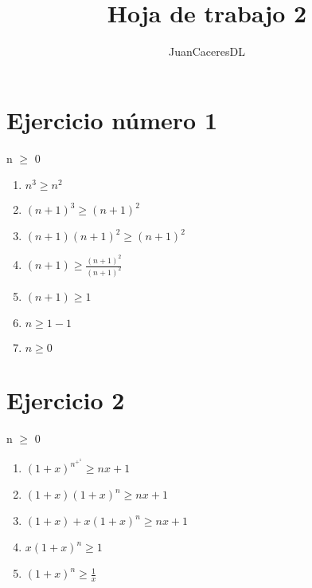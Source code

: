 \documentclass{article}
\title{Hoja de trabajo 2}
\author{JuanCaceresDL}
\begin{document}
\maketitle

\section{Ejercicio número 1}
\centering n $\geq$ 0
\begin{enumerate}
    \item $n^3 \geq n^2$
    \item $(n + 1)^3 \geq (n + 1)^2$
    \item $(n + 1)(n + 1)^2 \geq (n + 1)^2$
    \item $(n + 1) \geq \frac{(n + 1)^2}{(n + 1)^2}$
    \item $(n + 1) \geq 1$
    \item $n \geq 1 - 1$
    \item $n \geq 0$
\end{enumerate}
\section{Ejercicio 2}
\centering n $\geq$ 0
\begin{enumerate}
    \item $(1 + x)^n ^+ ^1 \geq nx +1$
    \item $(1 + x)(1 + x)^n \geq nx + 1$
    \item $(1 + x) + x(1 + x)^n \geq nx + 1$
    \item $x(1 + x)^n \geq 1$
    \item $(1 + x)^n \geq \frac{1}{x}$
\end{enumerate}
\end{document}

